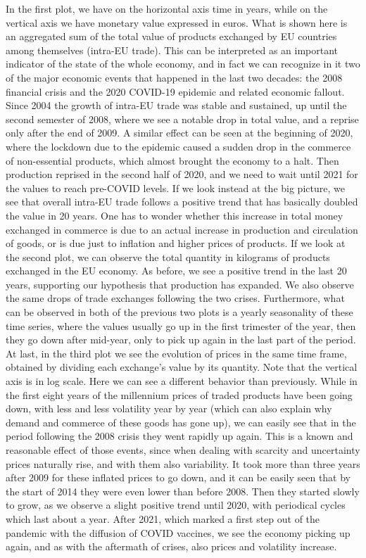 In the first plot, we have on the horizontal axis time in years, while on the vertical axis we have monetary value expressed in euros. What is shown here is an aggregated sum of the total value of products exchanged by EU countries among themselves (intra-EU trade). This can be interpreted as an important indicator of the state of the whole economy, and in fact we can recognize in it two of the major economic events that happened in the last two decades: the 2008 financial crisis and the 2020 COVID-19 epidemic and related economic fallout. Since 2004 the growth of intra-EU trade was stable and sustained, up until the second semester of 2008, where we see a notable drop in total value, and a reprise only after the end of 2009. A similar effect can be seen at the beginning of 2020, where the lockdown due to the epidemic caused a sudden drop in the commerce of non-essential products, which almost brought the economy to a halt. Then production reprised in the second half of 2020, and we need to wait until 2021 for the values to reach pre-COVID levels.
If we look instead at the big picture, we see that overall intra-EU trade follows a positive trend that has basically doubled the value in 20 years. One has to wonder whether this increase in total money exchanged in commerce is due to an actual increase in production and circulation of goods, or is due just to inflation and higher prices of products. If we look at the second plot, we can observe the total quantity in kilograms of products exchanged in the EU economy. As before, we see a positive trend in the last 20 years, supporting our hypothesis that production has expanded. We also observe the same drops of trade exchanges following the two crises. Furthermore, what can be observed in both of the previous two plots is a yearly seasonality of these time series, where the values usually go up in the first trimester of the year, then they go down after mid-year, only to pick up again in the last part of the period. 
At last, in the third plot we see the evolution of prices in the same time frame, obtained by dividing each exchange's value by its quantity. Note that the vertical axis is in log scale. Here we can see a different behavior than previously. While in the first eight years of the millennium prices of traded products have been going down, with less and less volatility year by year (which can also explain why demand and commerce of these goods has gone up), we can easily see that in the period following the 2008 crisis they went rapidly up again. This is a known and reasonable effect of those events, since when dealing with scarcity and uncertainty prices naturally rise, and with them also variability. It took more than three years after 2009 for these inflated prices to go down, and it can be easily seen that by the start of 2014 they were even lower than before 2008. Then they started slowly to grow, as we observe a  slight positive trend until 2020, with periodical cycles which last about a year. After 2021, which marked a first step out of the pandemic with the diffusion of COVID vaccines, we see the economy picking up again, and as with the aftermath of crises, also prices and volatility increase.

